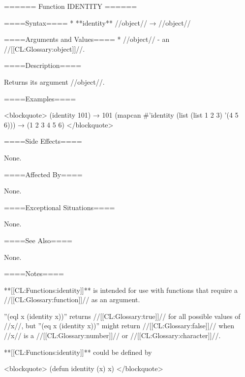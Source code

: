 ====== Function IDENTITY ======

====Syntax====
  * **identity** //object// → //object//

====Arguments and Values====
  * //object// - an //[[CL:Glossary:object]]//.

====Description====

Returns its argument //object//.

====Examples====

<blockquote> (identity 101) → 101 (mapcan #'identity (list (list 1 2 3) '(4 5 6))) → (1 2 3 4 5 6) </blockquote>

====Side Effects====

None.

====Affected By====

None.

====Exceptional Situations====

None.

====See Also====

None.

====Notes====

**[[CL:Functions:identity]]** is intended for use with functions that require a //[[CL:Glossary:function]]// as an argument.

''(eql x (identity x))'' returns //[[CL:Glossary:true]]// for all possible values of //x//, but ''(eq x (identity x))'' might return //[[CL:Glossary:false]]// when //x// is a //[[CL:Glossary:number]]// or //[[CL:Glossary:character]]//.

**[[CL:Functions:identity]]** could be defined by

<blockquote> (defun identity (x) x) </blockquote>


